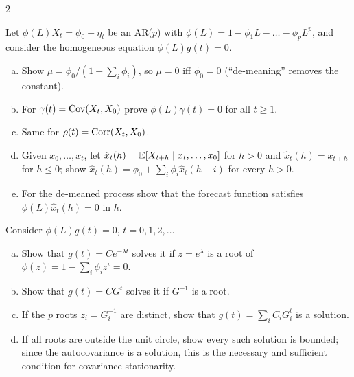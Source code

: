 \begin{paracol}{2}
\begin{exercise}\label{ch09:ex-ps4-2}
Let $\phi(L)X_t=\phi_0+\eta_t$ be an AR($p$) with $\phi(L)=1-\phi_1L-\dots-\phi_pL^p$, and consider the homogeneous equation $\phi(L)g(t)=0$.
\begin{enumerate}[(a)]
  \item Show $\mu=\phi_0/(1-\sum_i\phi_i)$, so $\mu=0$ iff $\phi_0=0$
      (``de-meaning'' removes the constant).
  \item For $\gamma(t)=\operatorname{Cov}(X_t,X_0)$ prove $\phi(L)\gamma(t)=0$ for all $t\ge1$.
  \item Same for $\rho(t)=\operatorname{Corr}(X_t,X_0)$.
  \item Given $x_0,\dots,x_t$, let $\hat x_t(h)=\mathbb{E}[X_{t+h}\mid x_t,\dots,x_0]$ for $h>0$
      and $\hat x_t(h)=x_{t+h}$ for $h\le0$; show $\hat x_t(h)=\phi_0+\sum_i\phi_i\hat x_t(h-i)$ for every $h>0$.
  \item For the de-meaned process show that the forecast function satisfies $\phi(L)\hat x_t(h)=0$ in $h$.
\end{enumerate}
\end{exercise}

\begin{exercise}\label{ch09:ex-ps4-3}
Consider $\phi(L)g(t)=0$, $t=0,1,2,\dots$
\begin{enumerate}[(a)]
  \item Show that $g(t)=Ce^{-\lambda t}$ solves it if $z=e^{\lambda}$ is a root of $\phi(z)=1-\sum_i\phi_iz^i=0$.
  \item Show that $g(t)=CG^t$ solves it if $G^{-1}$ is a root.
  \item If the $p$ roots
      $z_i=G_i^{-1}$ are distinct, show that $g(t)=\sum_iC_iG_i^t$ is a solution.
  \item If all roots are outside the unit circle, show every such solution is bounded; since the autocovariance is a solution, this is the necessary and sufficient
      condition for covariance stationarity.
\end{enumerate}
\end{exercise}


\end{paracol}
